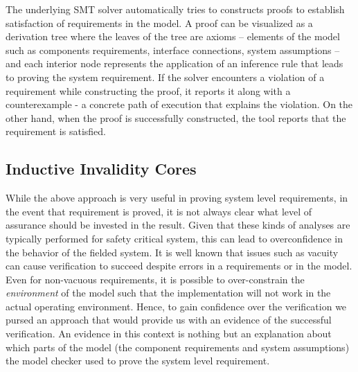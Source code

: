The underlying SMT solver automatically tries to constructs proofs to establish satisfaction of requirements in the model. A proof can be visualized as a derivation tree where the leaves of the tree are axioms -- elements of the model such as components requirements, interface connections, system assumptions -- and each interior node represents the application of an inference rule that leads to proving the system requirement. If the solver encounters a violation of a requirement while constructing the proof, it reports it along with a counterexample - a concrete path of execution that explains the violation. On the other hand, when the proof is successfully constructed, the tool reports that the requirement is satisfied. %


\subsection{Inductive Invalidity Cores}

While the above approach is very useful in proving system level requirements, in the event
that requirement is proved, it is not always clear what level of assurance should be invested in the
result.  Given that these kinds of analyses are typically performed for safety critical system, this
can lead to overconfidence in the behavior of the fielded system. It is well known that issues such as
vacuity~\cite{Kupferman03:Vacuity} can cause verification to succeed despite errors in a requirements
or in the model. Even for non-vacuous requirements, it is possible to over-constrain the {\em
environment} of the model such that the implementation will not work in the actual operating
environment. Hence, to gain confidence over the verification we pursed an approach that would provide
us with an evidence of the successful verification. An evidence in this context is nothing but an
explanation about which parts of the model (the component requirements and system assumptions) the
model checker used to prove the system level requirement.

